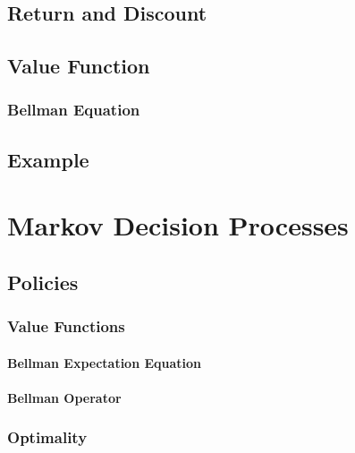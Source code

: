 		\subsection{Return and Discount} %

		\subsection{Value Function} %

			\subsubsection{Bellman Equation} %

		\subsection{Example} %

	\section{Markov Decision Processes} %

		\subsection{Policies} %

			\subsubsection{Value Functions} %

				\paragraph{Bellman Expectation Equation} %

				\paragraph{Bellman Operator} %

			\subsubsection{Optimality} %

